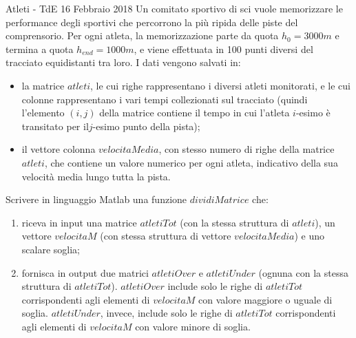 \documentclass[format=169, 10pt]{beamer}
\begin{document}
\begin{frame}[allowframebreaks]{Atleti - TdE 16 Febbraio 2018}
Un comitato sportivo di sci vuole memorizzare le performance degli sportivi che percorrono la più ripida  
delle piste del comprensorio.
Per ogni atleta, la memorizzazione parte da quota $h_0 = 3000 m$ e termina a  
quota $h_{end} = 1000 m$, e viene effettuata in 100 punti diversi del tracciato equidistanti tra loro.
I dati vengono salvati in:
\begin{itemize}
	\item la matrice $atleti$, le cui righe rappresentano i diversi atleti monitorati, e le cui colonne rappresentano i vari tempi collezionati sul tracciato (quindi l’elemento $(i,j)$ della matrice contiene il tempo in cui l'atleta $i$-­esimo è transitato per il$j$-­esimo punto della pista);
	\item il vettore colonna $velocitaMedia$, con stesso numero di righe della matrice $atleti$, che contiene un valore numerico per ogni atleta, indicativo della sua velocità media lungo tutta la pista.
\end{itemize}  

\framebreak

Scrivere in linguaggio Matlab una funzione $dividiMatrice$ che:
\begin{enumerate}
	\item riceva in input una matrice $atletiTot$ (con la stessa struttura di $atleti$), un vettore $velocitaM$ (con stessa struttura di vettore $velocitaMedia$) e uno scalare soglia;
	\item fornisca in output due matrici $atletiOver$ e $atletiUnder$ (ognuna con la stessa struttura di $atletiTot$).
	$atletiOver$ include solo le righe di $atletiTot$ corrispondenti agli elementi di $velocitaM$ con valore maggiore o uguale di soglia.
	$atletiUnder$, invece, include solo le righe di $atletiTot$ corrispondenti agli elementi di $velocitaM$ con valore minore di soglia. 
\end{enumerate}
\end{frame}
\end{document}
